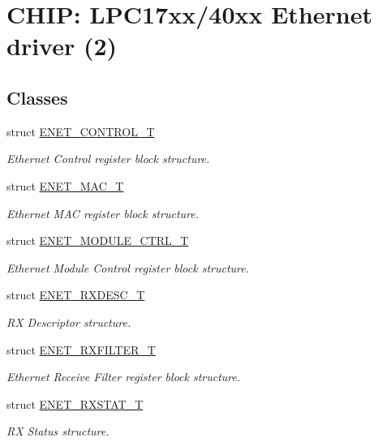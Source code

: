\hypertarget{group__ENET__17XX__40XX}{}\section{C\+H\+IP\+: L\+P\+C17xx/40xx Ethernet driver (2)}
\label{group__ENET__17XX__40XX}
\subsection*{Classes}
\begin{DoxyCompactItemize}
\item 
struct \hyperlink{structENET__CONTROL__T}{E\+N\+E\+T\+\_\+\+C\+O\+N\+T\+R\+O\+L\+\_\+T}
\begin{DoxyCompactList}\small\item\em Ethernet Control register block structure. \end{DoxyCompactList}\item 
struct \hyperlink{structENET__MAC__T}{E\+N\+E\+T\+\_\+\+M\+A\+C\+\_\+T}
\begin{DoxyCompactList}\small\item\em Ethernet M\+AC register block structure. \end{DoxyCompactList}\item 
struct \hyperlink{structENET__MODULE__CTRL__T}{E\+N\+E\+T\+\_\+\+M\+O\+D\+U\+L\+E\+\_\+\+C\+T\+R\+L\+\_\+T}
\begin{DoxyCompactList}\small\item\em Ethernet Module Control register block structure. \end{DoxyCompactList}\item 
struct \hyperlink{structENET__RXDESC__T}{E\+N\+E\+T\+\_\+\+R\+X\+D\+E\+S\+C\+\_\+T}
\begin{DoxyCompactList}\small\item\em RX Descriptor structure. \end{DoxyCompactList}\item 
struct \hyperlink{structENET__RXFILTER__T}{E\+N\+E\+T\+\_\+\+R\+X\+F\+I\+L\+T\+E\+R\+\_\+T}
\begin{DoxyCompactList}\small\item\em Ethernet Receive Filter register block structure. \end{DoxyCompactList}\item 
struct \hyperlink{structENET__RXSTAT__T}{E\+N\+E\+T\+\_\+\+R\+X\+S\+T\+A\+T\+\_\+T}
\begin{DoxyCompactList}\small\item\em RX Status structure. \end{DoxyCompactList}\item 

\end{DoxyCompactItemize}

